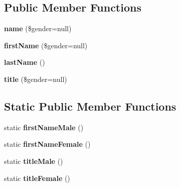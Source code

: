 \subsection*{Public Member Functions}
\begin{DoxyCompactItemize}
\item 
\mbox{\label{classFaker_1_1Provider_1_1Person_a612eb0e4dda01db0c06e29cc9af534a8}} 
{\bfseries name} (\$gender=null)
\item 
\mbox{\label{classFaker_1_1Provider_1_1Person_a63608efceaa9fa6a71d31cceb6385538}} 
{\bfseries first\+Name} (\$gender=null)
\item 
\mbox{\label{classFaker_1_1Provider_1_1Person_adf509b4ba24aba151b2dbb4e3dd982c6}} 
{\bfseries last\+Name} ()
\item 
\mbox{\label{classFaker_1_1Provider_1_1Person_a2446c8e35d9ffb97008ba087a89f1b9e}} 
{\bfseries title} (\$gender=null)
\end{DoxyCompactItemize}
\subsection*{Static Public Member Functions}
\begin{DoxyCompactItemize}
\item 
\mbox{\label{classFaker_1_1Provider_1_1Person_acc7056a4bfe1e64e8323384aaa721d27}} 
static {\bfseries first\+Name\+Male} ()
\item 
\mbox{\label{classFaker_1_1Provider_1_1Person_a748194a63b272afda544b06dfba297c8}} 
static {\bfseries first\+Name\+Female} ()
\item 
\mbox{\label{classFaker_1_1Provider_1_1Person_ae175cf00a252276dd39e6c34996b5f9d}} 
static {\bfseries title\+Male} ()
\item 
\mbox{\label{classFaker_1_1Provider_1_1Person_afb11d111d5202224841c38051d0c5857}} 
static {\bfseries title\+Female} ()
\end{DoxyCompactItemize}
